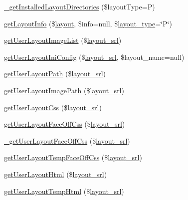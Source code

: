 \begin{DoxyCompactItemize}
\item 
\hyperlink{classlayoutModel_a326452abcba753f4bc8eb689909dc182}{\+\_\+get\+Installed\+Layout\+Directories} (\$layout\+Type=\textquotesingle{}P\textquotesingle{})
\item 
\hyperlink{classlayoutModel_a8f49f0b017ffa5fc1d12efd0dfab7c96}{get\+Layout\+Info} (\$\hyperlink{classlayout}{layout}, \$info=null, \$\hyperlink{ko_8install_8php_a0532d89570cfdaebc628afac2ff5a81b}{layout\+\_\+type}=\char`\"{}P\char`\"{})
\item 
\hyperlink{classlayoutModel_a6bb9dc3b7dc427d7916bf2a743b8e412}{get\+User\+Layout\+Image\+List} (\$\hyperlink{ko_8install_8php_a70054876db09b2519a1726663c8dd9e7}{layout\+\_\+srl})
\item 
\hyperlink{classlayoutModel_acf8661d658078547d762fb582f09e3b9}{get\+User\+Layout\+Ini\+Config} (\$\hyperlink{ko_8install_8php_a70054876db09b2519a1726663c8dd9e7}{layout\+\_\+srl}, \$layout\+\_\+name=null)
\item 
\hyperlink{classlayoutModel_ad852fe1c8eab29b23c998560031eabe4}{get\+User\+Layout\+Path} (\$\hyperlink{ko_8install_8php_a70054876db09b2519a1726663c8dd9e7}{layout\+\_\+srl})
\item 
\hyperlink{classlayoutModel_a8d7574bcc9329207e6cc1eb2da163288}{get\+User\+Layout\+Image\+Path} (\$\hyperlink{ko_8install_8php_a70054876db09b2519a1726663c8dd9e7}{layout\+\_\+srl})
\item 
\hyperlink{classlayoutModel_a1c4e0310f7fce01392ddae5eeb849a5c}{get\+User\+Layout\+Css} (\$\hyperlink{ko_8install_8php_a70054876db09b2519a1726663c8dd9e7}{layout\+\_\+srl})
\item 
\hyperlink{classlayoutModel_a82cac2109b93170e8f573576de2eb0d0}{get\+User\+Layout\+Face\+Off\+Css} (\$\hyperlink{ko_8install_8php_a70054876db09b2519a1726663c8dd9e7}{layout\+\_\+srl})
\item 
\hyperlink{classlayoutModel_ab8fbcb8e92739d001e4a010bc5c5cf3b}{\+\_\+get\+User\+Layout\+Face\+Off\+Css} (\$\hyperlink{ko_8install_8php_a70054876db09b2519a1726663c8dd9e7}{layout\+\_\+srl})
\item 
\hyperlink{classlayoutModel_aadc68d3ed9d3706536ff8d93d1aebd56}{get\+User\+Layout\+Temp\+Face\+Off\+Css} (\$\hyperlink{ko_8install_8php_a70054876db09b2519a1726663c8dd9e7}{layout\+\_\+srl})
\item 
\hyperlink{classlayoutModel_ae1d2250f4bb3703f82998937c46a0a57}{get\+User\+Layout\+Html} (\$\hyperlink{ko_8install_8php_a70054876db09b2519a1726663c8dd9e7}{layout\+\_\+srl})
\item 
\hyperlink{classlayoutModel_a19aaacba7d0b1c9bb466534933595381}{get\+User\+Layout\+Temp\+Html} (\$\hyperlink{ko_8install_8php_a70054876db09b2519a1726663c8dd9e7}{layout\+\_\+srl})

\end{DoxyCompactItemize}
